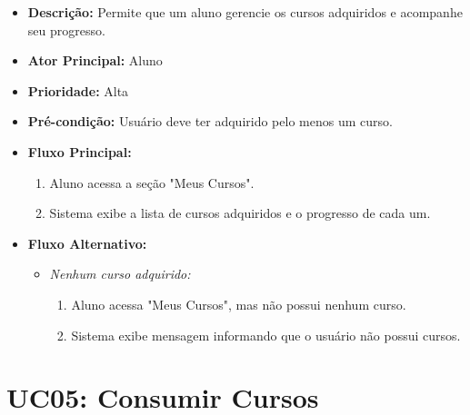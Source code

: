         \begin{itemize}
            \item \textbf{Descrição:} Permite que um aluno gerencie os cursos adquiridos e acompanhe seu progresso.
            
            \item \textbf{Ator Principal:} Aluno
            
            \item \textbf{Prioridade:} Alta
            
            \item \textbf{Pré-condição:} Usuário deve ter adquirido pelo menos um curso.
            
            \item \textbf{Fluxo Principal:}
            \begin{enumerate}
                \item Aluno acessa a seção "Meus Cursos".
                \item Sistema exibe a lista de cursos adquiridos e o progresso de cada um.
            \end{enumerate}

            \item \textbf{Fluxo Alternativo:}
            \begin{itemize}
                \item \textit{Nenhum curso adquirido:}
                \begin{enumerate}
                    \item Aluno acessa "Meus Cursos", mas não possui nenhum curso.
                    \item Sistema exibe mensagem informando que o usuário não possui cursos.
                \end{enumerate}
            \end{itemize}
        \end{itemize}

        \section*{UC05: Consumir Cursos}

